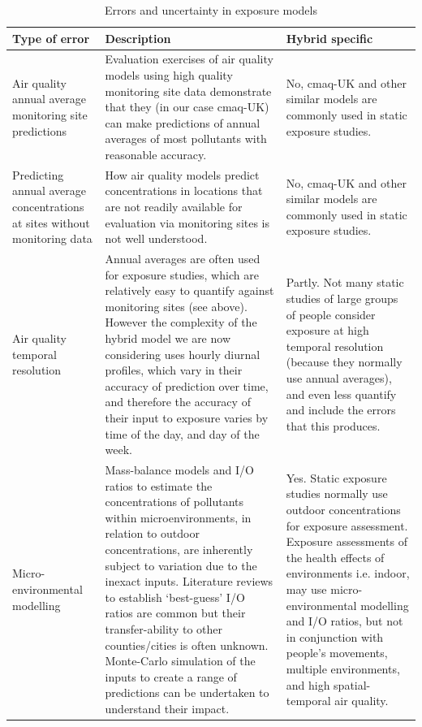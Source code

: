 \thispagestyle{empty}
\begin{landscape}

\begin{table}[ht]
\caption{Errors and uncertainty in exposure models}
\begin{tabular}{ | p{3.9cm} | p{13.0cm} | p{7.4cm} |}
\hline
\textbf{Type of error} & \textbf{Description} & \textbf{Hybrid specific} \\ \hline
        Air quality annual average monitoring site predictions  &  Evaluation exercises of air quality models using high quality monitoring site data demonstrate that they (in our case \gls{cmaq}-UK) can make predictions of annual averages of most pollutants with reasonable accuracy.         &  No, \gls{cmaq}-UK and other similar models are commonly used in static exposure studies.         \\ \hline
        
        Predicting annual average concentrations at sites without monitoring data  &  How air quality models predict concentrations in locations that are not readily available for evaluation via monitoring sites is not well understood.         &   No, \gls{cmaq}-UK and other similar models are commonly used in static exposure studies.        \\ \hline
        
        Air quality temporal resolution  &  Annual averages are often used for exposure studies, which are relatively easy to quantify against monitoring sites (see above). However the complexity of the hybrid model we are now considering uses hourly diurnal profiles, which vary in their accuracy of prediction over time, and therefore the accuracy of their input to exposure varies by time of the day, and day of the week.         &   Partly. Not many static studies of large groups of people consider exposure at high temporal resolution (because they normally use annual averages), and even less quantify and include the errors that this produces.        \\ \hline
        
        Micro-environmental modelling  &   Mass-balance models and I/O ratios to estimate the concentrations of pollutants within microenvironments, in relation to outdoor concentrations, are inherently subject to variation due to the inexact inputs. Literature reviews to establish ‘best-guess’ I/O ratios are common but their transfer-ability to other counties/cities is often unknown. Monte-Carlo simulation of the inputs to create a range of predictions can be undertaken to understand their impact.         &    Yes. Static exposure studies normally use outdoor concentrations for exposure assessment. Exposure assessments of the health effects of environments i.e. indoor, may use micro-environmental modelling and I/O ratios, but not in conjunction with people’s movements, multiple environments, and high spatial-temporal air quality.       \\ \hline
        

\end{tabular}
\end{table}
\end{landscape}
